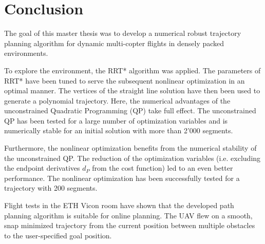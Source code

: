 \chapter{Conclusion}\label{chap:Conclusion}

The goal of this master thesis was to develop a numerical robust trajectory planning algorithm for dynamic multi-copter flights in densely packed environments. \newline

To explore the environment, the RRT* algorithm was applied. The parameters of RRT* have been tuned to serve the subsequent nonlinear optimization in an optimal manner. The vertices of the straight line solution have then been used to generate a polynomial trajectory. Here, the numerical advantages of the unconstrained Quadratic Programming (QP) take full effect. The unconstrained QP has been tested for a large number of optimization variables and is numerically stable for an initial solution with more than 2'000 segments. \newline

Furthermore, the nonlinear optimization benefits from the numerical stability of the unconstrained QP. The reduction of the optimization variables (i.e. excluding the endpoint derivatives $d_P$ from the cost function) led to an even better performance. The nonlinear optimization has been successfully tested for a trajectory with 200 segments. \newline

Flight tests in the ETH Vicon room have shown that the developed path planning algorithm is suitable for online planning. The UAV flew on a smooth, snap minimized trajectory from the current position between multiple obstacles to the user-specified goal position. 




